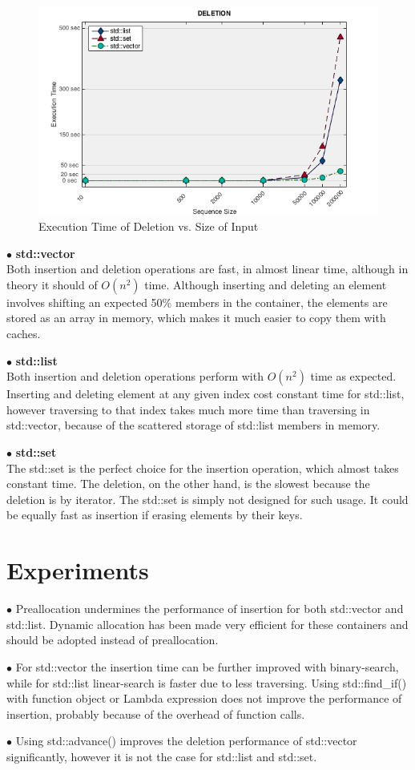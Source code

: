 \documentclass[11pt, oneside]{article}   	%
\begin{document}
\begin{figure}[H]
\includegraphics[width=\linewidth]{plot_deletion.png}
\caption{Execution Time of Deletion vs. Size of Input}
\end{figure}

$\bullet$ \textbf{std::vector}\\
Both insertion and deletion operations are fast, in almost linear time, although in theory it should of \(O(n^2)\) time. Although inserting and deleting an element involves shifting an expected 50\% members in the container, the elements are stored as an array in memory, which makes it much easier to copy them with caches.

$\bullet$ \textbf{std::list}\\
Both insertion and deletion operations perform with \(O(n^2)\) time as expected. Inserting and deleting element at any given index cost constant time for std::list, however traversing to that index takes much more time than traversing in std::vector, because of the scattered storage of std::list members in memory.

$\bullet$ \textbf{std::set}\\
The std::set is the perfect choice for the insertion operation, which almost takes constant time. The deletion, on the other hand, is the slowest because the deletion is by iterator. The std::set is simply not designed for such usage. It could be equally fast as insertion if erasing elements by their keys.

\section*{Experiments}

$\bullet$ Preallocation undermines the performance of insertion for both std::vector and std::list. Dynamic allocation has been made very efficient for these containers and should be adopted instead of preallocation.

$\bullet$ For std::vector the insertion time can be further improved with binary-search, while for std::list linear-search is faster due to less traversing. Using std::find\_if() with function object or Lambda expression does not improve the performance of insertion, probably because of the overhead of function calls.

$\bullet$ Using std::advance() improves the deletion performance of std::vector significantly, however it is not the case for std::list and std::set.
\end{document}
